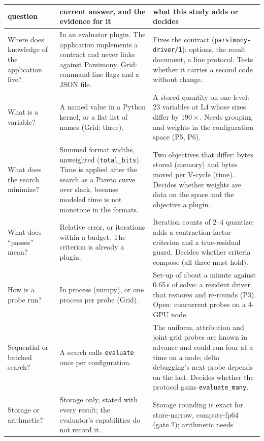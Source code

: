 \documentclass[11pt]{article}
\newcommand{\code}[1]{\texttt{#1}}
\begin{document}
\begin{center}
\footnotesize
\begin{tabularx}{\linewidth}{@{}>{\raggedright}p{2.6cm}>{\raggedright}X>{\raggedright\arraybackslash}X@{}}
\toprule
question & current answer, and the evidence for it & what this study adds or decides \\
\midrule
Where does knowledge of the application live? &
  In an evaluator plugin.  The application implements a contract and never links against
  Parsimony.  Grid: command-line flags and a JSON file. &
  Fixes the contract (\code{parsimony-driver/1}): options, the result document, a line
  protocol.  Tests whether it carries a second code without change. \\
What is a variable? &
  A named value in a Python kernel, or a flat list of names (Grid: three). &
  A stored quantity on one level: 23 variables at L4 whose sizes differ by $190\times$.
  Needs grouping and weights in the configuration space (P5, P6). \\
What does the search minimize? &
  Summed format widths, unweighted (\code{total\_bits}).  Time is applied after the search as
  a Pareto curve over slack, because modeled time is not monotone in the formats. &
  Two objectives that differ: bytes stored (memory) and bytes moved per V-cycle (time).
  Decides whether weights are data on the space and the objective a plugin. \\
What does ``passes'' mean? &
  Relative error, or iterations within a budget.  The criterion is already a plugin. &
  Iteration counts of 2--4 quantize; adds a contraction-factor criterion and a true-residual
  guard.  Decides whether criteria compose (all three must hold). \\
How is a probe run? &
  In process (numpy), or one process per probe (Grid). &
  Set-up of about a minute against 0.65\,s of solve: a resident driver that restores and
  re-rounds (P3).  Open: concurrent probes on a 4-GPU node. \\
Sequential or batched search? &
  A search calls \code{evaluate} once per configuration. &
  The uniform, attribution and joint-grid probes are known in advance and could run four at a
  time on a node; delta debugging's next probe depends on the last.  Decides whether the
  protocol gains \code{evaluate\_many}. \\
Storage or arithmetic? &
  Storage only, stated with every result; the evaluator's capabilities do not record it. &
  Storage rounding is exact for store-narrow, compute-fp64 (gate 2); arithmetic needs

\end{tabularx}
\end{center}
\end{document}
